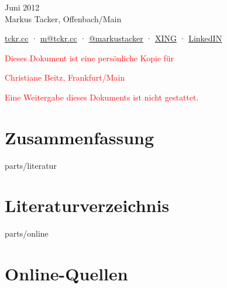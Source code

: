 \documentclass[11pt,a4paper]{article}
\newcommand{\person}{Christiane Beitz, Frankfurt/Main}
\begin{document}



\begin{center}

Juni 2012\\
Markus Tacker, Offenbach/Main

\begin{small}
\href{http://tckr.cc/}{tckr.cc} · \href{mailto:m@tckr.cc}{m@tckr.cc} · \href{http://twitter.com/markustacker}{@markustacker} · \href{https://www.xing.com/profile/Markus_Tacker}{XING} · \href{http://www.linkedin.com/in/markustacker}{LinkedIN}
\end{small}

\vspace{2cm}

\textcolor{red}{Dieses Dokument ist eine persönliche Kopie für}

\begin{large}
\textcolor{red}{\person}
\end{large}

\textcolor{red}{Eine Weitergabe dieses Dokuments ist nicht gestattet.}

\end{center}

\pagebreak

\section*{Zusammenfassung}



\pagebreak



\setcounter{page}{1}

















\pagebreak

\mbox{}

\pagebreak

\begin{btSect}{parts/literatur}
\section*{Literaturverzeichnis}
\btPrintCited
\end{btSect}
\begin{btSect}{parts/online}
\section*{Online-Quellen}
\btPrintCited
\end{btSect}
\end{document}
